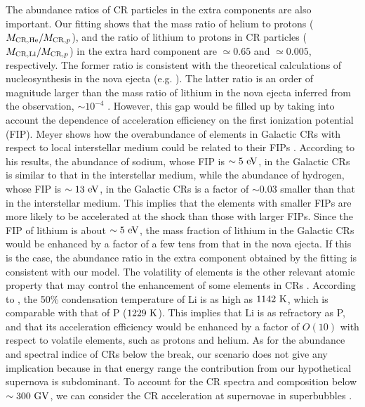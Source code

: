 \documentclass[twocolumn,showpacs,amsmath,amssymb]{revtex4-1}
\begin{document}
The abundance ratios of CR particles in the extra components are also important.  Our fitting shows that the mass ratio of helium to protons ($M_{\rm CR, He}/M_{{\rm CR},p}$), and the ratio of lithium to protons in CR particles ($M_{{\rm CR, Li}}/M_{{\rm CR},p}$) in the extra hard component are $\simeq 0.65$ and $\simeq 0.005$, respectively.  The former ratio is consistent with the theoretical calculations of nucleosynthesis in the nova ejecta (e.g. \cite{1998ApJ...494..680J, 2016PASJ...68...39L}).  The latter ratio is an order of magnitude larger than the mass ratio of lithium in the nova ejecta inferred from the observation, $\sim 10^{-4}$ \cite{2015Natur.518..381T, 2016ApJ...818..191T}.  However, this gap would be filled up by taking into account the dependence of acceleration efficiency on the first ionization potential (FIP).  Meyer shows how the overabundance of elements in Galactic CRs with respect to local interstellar medium could be related to their FIPs \cite{1985ApJS...57..173M}.  According to his results, the abundance of sodium, whose FIP is $\sim 5~{\rm eV}$, in the Galactic CRs is similar to that in the interstellar medium, while the abundance of hydrogen, whose FIP is $\sim 13~{\rm eV}$, in the Galactic CRs is a factor of $\sim 0.03$ smaller than that in the interstellar medium.  This implies that the elements with smaller FIPs are more likely to be accelerated at the shock than those with larger FIPs.  Since the FIP of lithium is about $\sim 5~{\rm eV}$, the mass fraction of lithium in the Galactic CRs would be enhanced by a factor of a few tens from that in the nova ejecta.  If this is the case, the abundance ratio in the extra component obtained by the fitting is consistent with our model.  The volatility of elements is the other relevant atomic property that may control the enhancement of some elements in CRs \cite{1997ApJ...487..182M}.  According to \cite{2003ApJ...591.1220L}, the 50\% condensation temperature of Li is as high as $1142~{\rm K}$, which is comparable with that of P ($1229~{\rm K}$).  This implies that Li is as refractory as P, and that its acceleration efficiency would be enhanced by a factor of $O(10)$ with respect to volatile elements, such as protons and helium.  As for the abundance and spectral indice of CRs below the break, our scenario does not give any implication because in that energy range the contribution from our hypothetical supernova is subdominant.  To account for the CR spectra and composition below $\sim 300~{\rm GV}$, we can consider the CR acceleration at supernovae in superbubbles \citep{2011ApJ...729L..13O, 2016PhRvD..93h3001O}.
\end{document}
